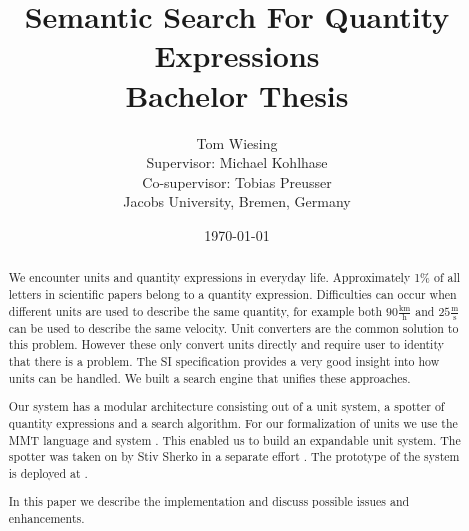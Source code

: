 \documentclass[11pt]{article}
\title{Semantic Search For Quantity Expressions\\ \vspace{2 mm} Bachelor Thesis}
\author{Tom Wiesing\\Supervisor: Michael Kohlhase\\Co-supervisor: Tobias Preusser\\Jacobs University, Bremen, Germany}
\date{\today}
\begin{document}
\maketitle

\begin{abstract}

  We encounter units and quantity expressions in everyday life. Approximately 1\% of all letters in scientific papers belong to a quantity expression. Difficulties can occur when different units are used to describe the same quantity, for example both $90 \frac{\text{km}}{\text{h}}$ and $25 \frac{\text{m}}{\text{s}}$ can be used to describe the same velocity. Unit converters are the common solution to this problem. However these only convert units directly and require user to identity that there is a problem. The SI specification \cite{sispec} provides a very good insight into how units can be handled. We built a search engine that unifies these approaches.

  Our system has a modular architecture consisting out of a unit system, a spotter of quantity expressions and a search algorithm. For our formalization of units we use the MMT language and system \cite{RabKoh:WSMSML13}. This enabled us to build an expandable unit system. The spotter was taken on by Stiv Sherko in a separate effort \cite{thesis:sharko}. The prototype of the system is deployed at \cite{self:sqesdemo}.

  In this paper we describe the implementation and discuss possible issues and enhancements.
\end{abstract}

\newpage

\tableofcontents

\FloatBarrier
\newpage



\FloatBarrier
\newpage



\FloatBarrier
\newpage



\FloatBarrier
\newpage




\FloatBarrier
\newpage



\FloatBarrier
\newpage



\newpage

{}
\end{document}

